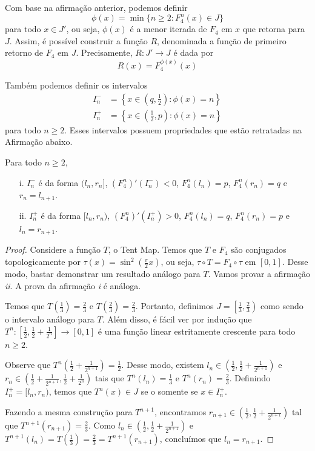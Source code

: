 Com base na afirmação anterior, podemos definir
$$\phi(x) = \min \{ n \geq 2 : F_4^n(x) \in J \}$$
para todo $x \in J'$, ou seja, $\phi(x)$ é a menor iterada de $F_4$ em $x$ que retorna para $J$.  Assim, é possível construir a função $R$, denominada a função de primeiro retorno de $F_4$ em $J$. Precisamente, $R: J' \to J$ é dada por
$$R(x) = F_4^{\phi(x)}(x)$$

Também podemos definir os intervalos
\begin{align*}
I^-_n & = \left \{ x \in \left ( q, \frac{1}{2} \right ) : \phi(x) = n \right \}\\
I^+_n & = \left \{ x \in \left ( \frac{1}{2}, p \right ) : \phi(x) = n \right \}
\end{align*}
para todo $n \geq 2$. Esses intervalos possuem propriedades que estão retratadas na Afirmação abaixo.

\begin{affirmation}
Para todo $n \geq 2$,
\begin{enumerate}
\item[i.] $I^-_n$ é da forma $(l_n, r_n]$, $(F_4^n)'(I^-_n) < 0$, $F_4^n(l_n) = p$, $F_4^n(r_n) = q$ e $r_n = l_{n+1}$.
\item[ii.] $I^+_n$ é da forma $[l_n, r_n)$, $(F_4^n)'(I^+_n) > 0$, $F_4^n(l_n) = q$, $F_4^n(r_n) = p$ e $l_n = r_{n+1}$.
\end{enumerate}
\end{affirmation}

\begin{proof}
Considere a função $T$, o Tent Map. Temos que $T$ e $F_4$ são conjugados topologicamente por $\tau(x) = \sin^2 \left( \frac{\pi}{2} x \right)$, ou seja, $\tau \circ T = F_4 \circ \tau$ em $[0, 1]$. Desse modo, bastar demonstrar um resultado análogo para $T$. Vamos provar a afirmação \textit{ii}. A prova da afirmação \textit{i} é análoga.

Temos que $T\left( \frac{1}{3} \right) = \frac{2}{3}$ e $T\left( \frac{2}{3} \right) = \frac{2}{3}$. Portanto, definimos $J = \left[ \frac{1}{3}, \frac{2}{3} \right)$ como sendo o intervalo análogo para $T$. Além disso, é fácil ver por indução que $T^n: \left[ \frac{1}{2}, \frac{1}{2} + \frac{1}{2^n} \right] \to [0, 1]$ é uma função linear estritamente crescente para todo $n \geq 2$.

Observe que $T^n\left( \frac{1}{2} + \frac{1}{2^{n+1}}\right) = \frac{1}{2}$. Desse modo, existem $l_n \in \left(\frac{1}{2}, \frac{1}{2} + \frac{1}{2^{n+1}}\right)$ e $r_n \in \left(\frac{1}{2} + \frac{1}{2^{n+1}}, \frac{1}{2} + \frac{1}{2^n} \right)$ tais que $T^n(l_n) = \frac{1}{3}$ e $T^n(r_n) = \frac{2}{3}$. Definindo $I^+_n = [l_n, r_n)$, temos que $T^n(x) \in J$ se o somente se $x \in I^+_n$.

Fazendo a mesma construção para $T^{n+1}$, encontramos $r_{n+1} \in \left(\frac{1}{2}, \frac{1}{2} + \frac{1}{2^{n+1}}\right)$ tal que $T^{n+1}(r_{n+1}) = \frac{2}{3}$. Como $l_n \in \left(\frac{1}{2}, \frac{1}{2} + \frac{1}{2^{n+1}}\right)$ e $T^{n+1}(l_n) = T\left(\frac{1}{3}\right) = \frac{2}{3} = T^{n+1}(r_{n+1})$, concluímos que $l_n = r_{n+1}$.
\end{proof}


